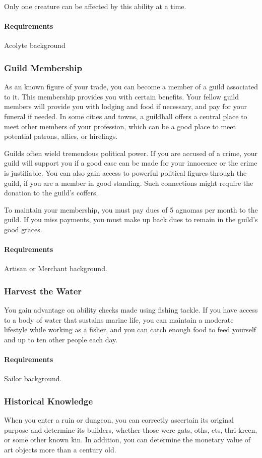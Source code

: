     Only one creature can be affected by this ability at a time.
    \paragraph{Requirements} Acolyte background
\subsubsection{Guild Membership} \label{feat::guildmembership}
    As an known figure of your trade, you can become a member of a guild associated to it.
    This membership provides you with certain benefits.
    Your fellow guild members will provide you with lodging and food if necessary, and pay for your funeral if needed.
    In some cities and towns, a guildhall offers a central place to meet other members of your profession, which can be a good place to meet potential patrons, allies, or hirelings.

    Guilds often wield tremendous political power.
    If you are accused of a crime, your guild will support you if a good case can be made for your innocence or the crime is justifiable.
    You can also gain access to powerful political figures through the guild, if you are a member in good standing.
    Such connections might require the donation to the guild's coffers.

    To maintain your membership, you must pay dues of 5 agnomas per month to the guild.
    If you miss payments, you must make up back dues to remain in the guild's good graces.
    \paragraph{Requirements} Artisan or Merchant background.
\subsubsection{Harvest the Water} \label{feat::harvestthewater}
    You gain advantage on ability checks made using fishing tackle.
    If you have access to a body of water that sustains marine life, you can maintain a moderate lifestyle while working as a fisher, and you can catch enough food to feed yourself and up to ten other people each day.
    \paragraph{Requirements} Sailor background.
\subsubsection{Historical Knowledge} \label{feat::historicalknowledge}
    When you enter a ruin or dungeon, you can correctly ascertain its original purpose and determine its builders, whether those were gats, oths, ets, thri-kreen, or some other known kin.
    In addition, you can determine the monetary value of art objects more than a century old.
